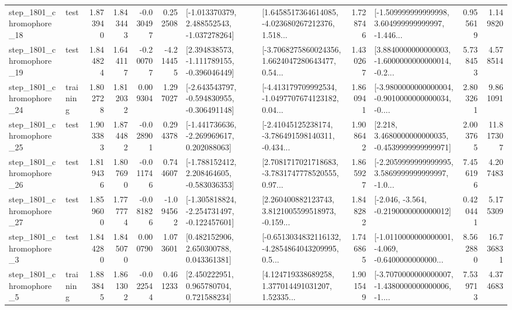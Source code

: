 \begin{tabular}{llrrrrllrlrr}
 step\_1801\_chromophore\_18 &      test &      1.873940 &    1.843443 &     -0.030497 &  0.252508 &   [-1.013370379, 2.488552543, -1.037278264] &  [1.6458517364614085, -4.023680267212376, 1.518... &       1.728746 &  [-1.509999999999998, 3.604999999999997, -1.446... &            0.955619 &          1.149820 \\
 step\_1801\_chromophore\_19 &      test &      1.844824 &    1.644117 &     -0.200707 & -4.214455 &   [2.394838573, -1.111789155, -0.396046449] &  [-3.7068275860024356, 1.6624047280643477, 0.54... &       1.430267 &  [3.8840000000000003, -1.6000000000000014, -0.2... &            5.738453 &          4.578514 \\
 step\_1801\_chromophore\_24 &  training &      1.802728 &    1.812032 &      0.009304 &  1.297027 &  [-2.643543797, -0.594830955, -0.306491148] &  [-4.413179709992534, -1.0497707674123182, 0.04... &       1.860941 &  [-3.9800000000000004, -0.9010000000000034, -0.... &            2.803261 &          9.861091 \\
 step\_1801\_chromophore\_25 &      test &      1.903383 &    1.874482 &     -0.028901 &  0.294378 &   [-1.441736636, -2.269969617, 0.202088063] &  [-2.41045125238174, -3.786491598140311, -0.434... &       1.908642 &   [2.218, 3.4680000000000035, -0.4539999999999971] &            2.003765 &         11.817307 \\
 step\_1801\_chromophore\_26 &      test &      1.819436 &    1.807690 &     -0.011746 &  0.744607 &   [-1.788152412, 2.208464605, -0.583036353] &  [2.7081717021718683, -3.7831747778520555, 0.97... &       1.865927 &  [-2.2059999999999995, 3.5869999999999997, -1.0... &            7.456196 &          4.207483 \\
 step\_1801\_chromophore\_27 &      test &      1.859600 &    1.777774 &     -0.081826 & -1.094562 &  [-1.305818824, -2.254731497, -0.122457601] &  [2.260400882123743, 3.8121005599518973, -0.159... &       1.848282 &              [-2.046, -3.564, -0.2190000000000012] &            0.420441 &          5.175309 \\
  step\_1801\_chromophore\_3 &      test &      1.844280 &    1.845070 &      0.000790 &  1.073601 &     [0.482152906, 2.650300788, 0.043361381] &  [-0.6513034832116132, -4.2854864043209995, 0.5... &       1.746865 &  [-1.0110000000000001, -4.069, -0.6400000000000... &            8.562880 &         16.736831 \\
  step\_1801\_chromophore\_5 &  training &      1.883845 &    1.861302 &     -0.022544 &  0.461233 &     [2.450222951, 0.965780704, 0.721588234] &  [4.124719338689258, 1.377014491031207, 1.52335... &       1.901549 &  [-3.7070000000000007, -1.4380000000000006, -1.... &            7.539713 &          4.374683 \\

\end{tabular}
